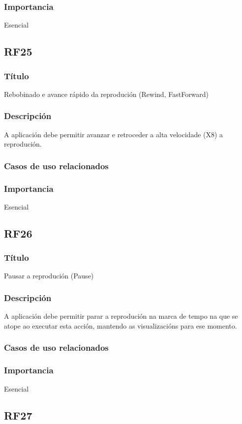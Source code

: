 \subsubsection{Importancia}
Esencial

\subsection{RF25}
\subsubsection{Título}
Rebobinado e avance rápido da reprodución (Rewind, FastForward)
\subsubsection{Descripción}
A aplicación debe permitir avanzar e retroceder a alta velocidade (X8) a reprodución.
\subsubsection{Casos de uso relacionados}
\subsubsection{Importancia}
Esencial

\subsection{RF26}
\subsubsection{Título}
Pausar a reprodución (Pause)
\subsubsection{Descripción}
A aplicación debe permitir parar a reprodución na marca de tempo na que se atope ao executar esta acción, mantendo as visualizacións para ese momento.
\subsubsection{Casos de uso relacionados}
\subsubsection{Importancia}
Esencial

\subsection{RF27}
